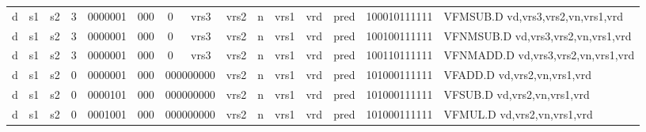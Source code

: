 \begin{landscape}
\begin{table}[p]
\begin{small}
\begin{center}
\begin{tabular}{p{0.08in}@{}p{0.08in}@{}p{0.08in}@{}p{0.08in}@{}p{0.50in}@{}p{0.30in}@{}p{0.08in}@{}p{0.8in}@{}p{0.48in}@{}p{0.32in}@{}p{0.08in}@{}p{0.8in}@{}p{0.8in}@{}p{0.4in}@{}p{0.56in}l}
\multicolumn{1}{|c|}{d} &
\multicolumn{1}{c|}{s1} &
\multicolumn{1}{c|}{s2} &
\multicolumn{1}{c|}{3} &
\multicolumn{1}{c|}{0000001} &
\multicolumn{1}{c|}{000} &
\multicolumn{1}{c|}{0} &
\multicolumn{1}{c|}{vrs3} &
\multicolumn{2}{c|}{vrs2} &
\multicolumn{1}{c|}{n} &
\multicolumn{1}{c|}{vrs1} &
\multicolumn{1}{c|}{vrd} &
\multicolumn{1}{c|}{pred} &
\multicolumn{1}{c|}{100010111111} & VFMSUB.D vd,vrs3,vrs2,vn,vrs1,vrd \\
\cline{1-15}
  

\multicolumn{1}{|c|}{d} &
\multicolumn{1}{c|}{s1} &
\multicolumn{1}{c|}{s2} &
\multicolumn{1}{c|}{3} &
\multicolumn{1}{c|}{0000001} &
\multicolumn{1}{c|}{000} &
\multicolumn{1}{c|}{0} &
\multicolumn{1}{c|}{vrs3} &
\multicolumn{2}{c|}{vrs2} &
\multicolumn{1}{c|}{n} &
\multicolumn{1}{c|}{vrs1} &
\multicolumn{1}{c|}{vrd} &
\multicolumn{1}{c|}{pred} &
\multicolumn{1}{c|}{100100111111} & VFNMSUB.D vd,vrs3,vrs2,vn,vrs1,vrd \\
\cline{1-15}
  

\multicolumn{1}{|c|}{d} &
\multicolumn{1}{c|}{s1} &
\multicolumn{1}{c|}{s2} &
\multicolumn{1}{c|}{3} &
\multicolumn{1}{c|}{0000001} &
\multicolumn{1}{c|}{000} &
\multicolumn{1}{c|}{0} &
\multicolumn{1}{c|}{vrs3} &
\multicolumn{2}{c|}{vrs2} &
\multicolumn{1}{c|}{n} &
\multicolumn{1}{c|}{vrs1} &
\multicolumn{1}{c|}{vrd} &
\multicolumn{1}{c|}{pred} &
\multicolumn{1}{c|}{100110111111} & VFNMADD.D vd,vrs3,vrs2,vn,vrs1,vrd \\
\cline{1-15}
  

\multicolumn{1}{|c|}{d} &
\multicolumn{1}{c|}{s1} &
\multicolumn{1}{c|}{s2} &
\multicolumn{1}{c|}{0} &
\multicolumn{1}{c|}{0000001} &
\multicolumn{1}{c|}{000} &
\multicolumn{2}{c|}{000000000} &
\multicolumn{2}{c|}{vrs2} &
\multicolumn{1}{c|}{n} &
\multicolumn{1}{c|}{vrs1} &
\multicolumn{1}{c|}{vrd} &
\multicolumn{1}{c|}{pred} &
\multicolumn{1}{c|}{101000111111} & VFADD.D vd,vrs2,vn,vrs1,vrd \\
\cline{1-15}
  

\multicolumn{1}{|c|}{d} &
\multicolumn{1}{c|}{s1} &
\multicolumn{1}{c|}{s2} &
\multicolumn{1}{c|}{0} &
\multicolumn{1}{c|}{0000101} &
\multicolumn{1}{c|}{000} &
\multicolumn{2}{c|}{000000000} &
\multicolumn{2}{c|}{vrs2} &
\multicolumn{1}{c|}{n} &
\multicolumn{1}{c|}{vrs1} &
\multicolumn{1}{c|}{vrd} &
\multicolumn{1}{c|}{pred} &
\multicolumn{1}{c|}{101000111111} & VFSUB.D vd,vrs2,vn,vrs1,vrd \\
\cline{1-15}
  

\multicolumn{1}{|c|}{d} &
\multicolumn{1}{c|}{s1} &
\multicolumn{1}{c|}{s2} &
\multicolumn{1}{c|}{0} &
\multicolumn{1}{c|}{0001001} &
\multicolumn{1}{c|}{000} &
\multicolumn{2}{c|}{000000000} &
\multicolumn{2}{c|}{vrs2} &
\multicolumn{1}{c|}{n} &
\multicolumn{1}{c|}{vrs1} &
\multicolumn{1}{c|}{vrd} &
\multicolumn{1}{c|}{pred} &
\multicolumn{1}{c|}{101000111111} & VFMUL.D vd,vrs2,vn,vrs1,vrd \\
\cline{1-15}
  


\end{tabular}
\end{center}
\end{small}
\end{table}
\end{landscape}
